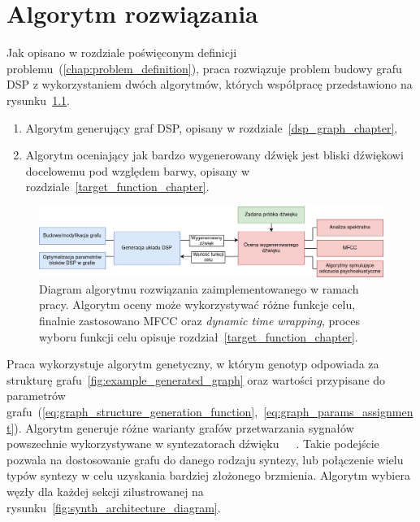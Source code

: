 \chapter{Algorytm rozwiązania}\label{chap:solution_algorithm}

Jak opisano w rozdziale poświęconym definicji problemu~(\ref{chap:problem_definition}), praca
rozwiązuje problem budowy grafu DSP z wykorzystaniem dwóch algorytmów, których współpracę przedstawiono na
rysunku~\ref{fig:solution_algorithm_diagram}.

\begin{enumerate}
  \item Algorytm generujący graf DSP, opisany w rozdziale~\ref{dsp_graph_chapter},
  \item Algorytm oceniający jak bardzo wygenerowany dźwięk jest bliski dźwiękowi docelowemu pod względem barwy,
    opisany w rozdziale~\ref{target_function_chapter}.
\end{enumerate}

\begin{figure}[H]    
    \centering
    \includegraphics[width=1.0\linewidth]{rys04/solution_algorithm_diagram.png}
    \caption{
      Diagram algorytmu rozwiązania zaimplementowanego w ramach pracy.
      Algorytm oceny może wykorzystywać różne funkcje celu, finalnie zastosowano
      MFCC oraz \textit{dynamic time wrapping},
      proces wyboru funkcji celu opisuje rozdział~\ref{target_function_chapter}.
    }\label{fig:solution_algorithm_diagram}
\end{figure}

Praca wykorzystuje algorytm genetyczny, w którym genotyp odpowiada za
strukturę grafu~\ref{fig:example_generated_graph} oraz wartości
przypisane do parametrów grafu~(\ref{eq:graph_structure_generation_function},~\ref{eq:graph_params_assignment}).
Algorytm generuje różne warianty grafów przetwarzania sygnałów powszechnie
wykorzystywane w syntezatorach dźwięku~\cite{minilogue_diagram}~\cite{digitone_manual}~\cite{yamaha_dx7_manual}.
Takie podejście pozwala na dostosowanie grafu do danego rodzaju syntezy,
lub połączenie wielu typów syntezy w celu uzyskania bardziej złożonego brzmienia.
Algorytm wybiera węzły dla każdej sekcji
zilustrowanej na rysunku~\ref{fig:synth_architecture_diagram}.

